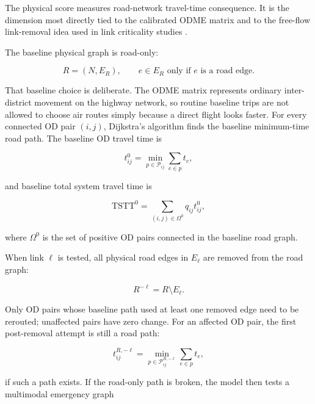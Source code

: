 \documentclass[11pt,a4paper]{article}
\begin{document}
The physical score measures road-network travel-time consequence. It is the
dimension most directly tied to the calibrated ODME matrix and to the
free-flow link-removal idea used in link criticality studies
\cite{almotahari2019}.

The baseline physical graph is road-only:

\begin{equation}
R=(N,E_R), \qquad e\in E_R \text{ only if } e \text{ is a road edge}.
\end{equation}

That baseline choice is deliberate. The ODME matrix represents ordinary
inter-district movement on the highway network, so routine baseline trips are
not allowed to choose air routes simply because a direct flight looks faster.
For every connected OD pair $(i,j)$, Dijkstra's algorithm finds the baseline
minimum-time road path. The baseline OD travel time is

\begin{equation}
t^0_{ij}=\min_{p\in\mathcal{P}_{ij}}\sum_{e\in p} t_e,
\label{eq:mlpi-base-path}
\end{equation}

and baseline total system travel time is

\begin{equation}
\mathrm{TSTT}^0=\sum_{(i,j)\in\Omega^0} q_{ij}t^0_{ij},
\label{eq:mlpi-tstt-base}
\end{equation}

where $\Omega^0$ is the set of positive OD pairs connected in the baseline road
graph.

When link $\ell$ is tested, all physical road edges in $E_{\ell}$ are removed
from the road graph:

\begin{equation}
R^{-\ell}=R\setminus E_{\ell}.
\end{equation}

Only OD pairs whose baseline path used at least one removed edge need to be
rerouted; unaffected pairs have zero change. For an affected OD pair, the first
post-removal attempt is still a road path:

\begin{equation}
t^{R,-\ell}_{ij}
=\min_{p\in\mathcal{P}^{R,-\ell}_{ij}}\sum_{e\in p}t_e,
\label{eq:mlpi-road-removed-time}
\end{equation}

if such a path exists. If the road-only path is broken, the model then tests a
multimodal emergency graph
\end{document}

